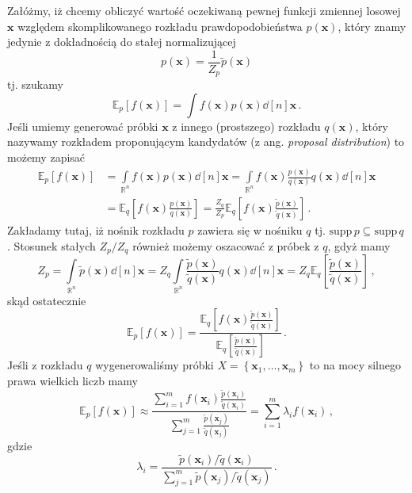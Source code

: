 \documentclass{myclass}
\numberwithin{equation}{subsection}
\begin{document}
Załóżmy, iż chcemy obliczyć wartość oczekiwaną pewnej funkcji zmiennej losowej \(\bm{x}\) względem
skomplikowanego rozkładu prawdopodobieństwa \(p(\bm{x})\), który znamy jedynie z dokładnością do
stałej normalizującej
\begin{equation}
    p(\bm{x}) = \frac{1}{Z_p}\tilde{p}(\bm{x})
\end{equation}
tj. szukamy
\begin{equation}
    \mathbb{E}_p[f(\bm{x})] = \int f(\bm{x}) p(\bm{x})\dd[n]\bm{x}\,.
\end{equation}
Jeśli umiemy generować próbki \(\bm{x}\) z innego (prostszego) rozkładu \(q(\bm{x})\), który
nazywamy rozkładem proponującym kandydatów (z ang. \textit{proposal distribution}) to możemy zapisać
\begin{equation}
    \begin{split}
        \mathbb{E}_p[f(\bm{x})] &= \int\limits_{\mathbb{R}^n}f(\bm{x})p(\bm{x})\dd[n]\bm{x} = \int\limits_{\mathbb{R}^n}f(\bm{x})\frac{p(\bm{x})}{q(\bm{x})}q(\bm{x})\dd[n]\bm{x}\\
         &=\mathbb{E}_q\left[f(\bm{x}) \frac{p(\bm{x})}{q(\bm{x})}\right] = \frac{Z_q}{Z_p}\mathbb{E}_q\left[f(\bm{x}) \frac{\tilde{p}(\bm{x})}{\tilde{q}(\bm{x})}\right]\,.
    \end{split}
\end{equation}
Zakładamy tutaj, iż nośnik rozkładu \(p\) zawiera się w nośniku \(q\) tj. \(\text{supp}\,p \subseteq
\text{supp}\,q\). Stosunek stałych \(Z_p / Z_q\) również możemy oszacować z próbek z \(q\), gdyż
mamy
\begin{equation}
    Z_p = \int\limits_{\mathbb{R}^n}\tilde{p}(\bm{x})\dd[n]{\bm{x}} = Z_q\int\limits_{\mathbb{R}^n}\frac{\tilde{p}(\bm{x})}{\tilde{q}(\bm{x})} q(\bm{x})\dd[n]{\bm{x}} = Z_q \mathbb{E}_q\left[\frac{\tilde{p}(\bm{x})}{\tilde{q}(\bm{x})}\right]\,,
\end{equation}
skąd ostatecznie
\begin{equation}
    \mathbb{E}_p[f(\bm{x})] = \frac{\mathbb{E}_q\left[f(\bm{x}) \frac{\tilde{p}(\bm{x})}{\tilde{q}(\bm{x})}\right]}{\mathbb{E}_q\left[\frac{\tilde{p}(\bm{x})}{\tilde{q}(\bm{x})}\right]}\,.
\end{equation}
Jeśli z rozkładu \(q\) wygenerowaliśmy próbki \(X = \left\{\bm{x}_1,\ldots,\bm{x}_m\right\}\) to na
mocy silnego prawa wielkich liczb mamy
\begin{equation}\boxed{
    \mathbb{E}_p[f(\bm{x})] \approx \frac{\sum_{i=1}^m f(\bm{x}_i) \frac{\tilde{p}(\bm{x}_i)}{\tilde{q}(\bm{x}_i)}}{\sum_{j=1}^m \frac{\tilde{p}(\bm{x}_j)}{\tilde{q}(\bm{x}_j)}} = \sum_{i=1}^m \lambda_i f(\bm{x}_i)\,,
}\end{equation}
gdzie
\begin{equation}\boxed{
    \lambda_i = \frac{\tilde{p}(\bm{x}_i) / \tilde{q}(\bm{x}_i)}{\sum_{j=1}^m \tilde{p}(\bm{x}_j) / \tilde{q}(\bm{x}_j) }\,.
}\end{equation}
\end{document}
